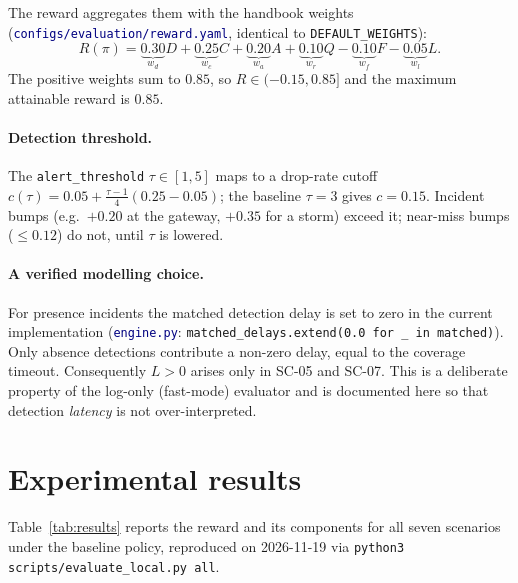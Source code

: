 \documentclass[11pt]{article}
\newcommand{\code}[1]{\texttt{\small #1}}
\newcommand{\file}[1]{\textcolor{navy}{\texttt{\small #1}}}
\begin{document}
The reward aggregates them with the handbook weights
(\file{configs/evaluation/reward.yaml}, identical to \code{DEFAULT\_WEIGHTS}):
\begin{equation}
R(\pi) = \underbrace{0.30}_{w_d}D + \underbrace{0.25}_{w_c}C + \underbrace{0.20}_{w_a}A + \underbrace{0.10}_{w_r}Q - \underbrace{0.10}_{w_f}F - \underbrace{0.05}_{w_l}L .
\label{eq:R}
\end{equation}
The positive weights sum to $0.85$, so $R\in(-0.15, 0.85]$ and the maximum
attainable reward is $\mathbf{0.85}$.

\paragraph{Detection threshold.} The \code{alert\_threshold}
$\tau\in[1,5]$ maps to a drop-rate cutoff $c(\tau)=0.05+\tfrac{\tau-1}{4}(0.25-0.05)$;
the baseline $\tau=3$ gives $c=0.15$. Incident bumps (e.g.\ $+0.20$ at the
gateway, $+0.35$ for a storm) exceed it; near-miss bumps ($\le 0.12$) do not,
until $\tau$ is lowered.

\paragraph{A verified modelling choice.} For presence incidents the matched
detection delay is set to zero in the current implementation
(\file{engine.py}: \code{matched\_delays.extend(0.0 for \_ in matched)}). Only
absence detections contribute a non-zero delay, equal to the coverage timeout.
Consequently $L>0$ arises only in SC-05 and SC-07. This is a deliberate property
of the log-only (fast-mode) evaluator and is documented here so that detection
\emph{latency} is not over-interpreted.

\section{Experimental results}
\label{sec:results}
Table~\ref{tab:results} reports the reward and its components for all seven
scenarios under the baseline policy, reproduced on 2026-11-19 via
\code{python3 scripts/evaluate\_local.py all}.
\end{document}
